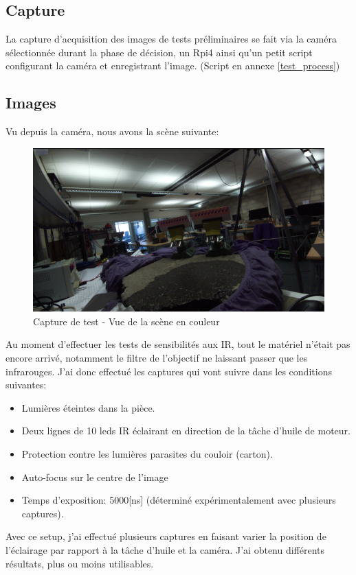 \subsection{Capture}
La capture d'acquisition des images de tests préliminaires se fait via la caméra sélectionnée durant la phase de décision, un Rpi4 ainsi
qu'un petit script configurant la caméra et enregistrant l'image. (Script en annexe \ref{test_process})
\newpage
\subsection{Images}
Vu depuis la caméra, nous avons la scène suivante:

\begin{figure}[H]
    \centering
    \includegraphics[width=13cm]{assets/figures/camera_vue_couleur1.png}
    \caption{Capture de test - Vue de la scène en couleur}
\end{figure}

Au moment d'effectuer les tests de sensibilités aux IR, tout le matériel n'était pas encore arrivé, notamment le filtre de l'objectif ne
laissant passer que les infrarouges. J'ai donc effectué les captures qui vont suivre dans les conditions suivantes:
\begin{itemize}
    \item Lumières éteintes dans la pièce.
    \item Deux lignes de 10 leds IR éclairant en direction de la tâche d'huile de moteur.
    \item Protection contre les lumières parasites du couloir (carton).
    \item Auto-focus sur le centre de l'image
    \item Temps d'exposition: 5000[ns] (déterminé expérimentalement avec plusieurs captures).
\end{itemize}
Avec ce setup, j'ai effectué plusieurs captures en faisant varier la position de l'éclairage par rapport à la tâche d'huile et la caméra.
J'ai obtenu différents résultats, plus ou moins utilisables.


